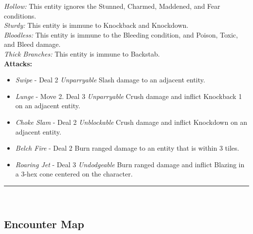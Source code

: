 \emph{Hollow:} This entity ignores the Stunned, Charmed, Maddened, and Fear conditions.\\

\emph{Sturdy:} This entity is immune to Knockback and Knockdown.\\

\emph{Bloodless:} This entity is immune to the Bleeding condition, and Poison, Toxic, and Bleed damage.\\

\emph{Thick Branches:} This entity is immune to Backstab.\\

\textbf{Attacks:}
\begin{itemize}
\item \emph{Swipe} - Deal 2 \emph{Unparryable} Slash damage to an adjacent entity.
\item \emph{Lunge} - Move 2. Deal 3 \emph{Unparryable} Crush damage and inflict Knockback 1 on an adjacent entity.
\item \emph{Choke Slam} - Deal 2 \emph{Unblockable} Crush damage and inflict Knockdown on an adjacent entity.
\item \emph{Belch Fire} - Deal 2 Burn ranged damage to an entity that is within 3 tiles.
\item \emph{Roaring Jet} - Deal 3 \emph{Undodgeable} Burn ranged damage and inflict Blazing in a 3-hex cone centered on the character.
\end{itemize}
\hrule
\ \\

\pagebreak

\subsection*{Encounter Map}
\begin{center}
\end{center}

